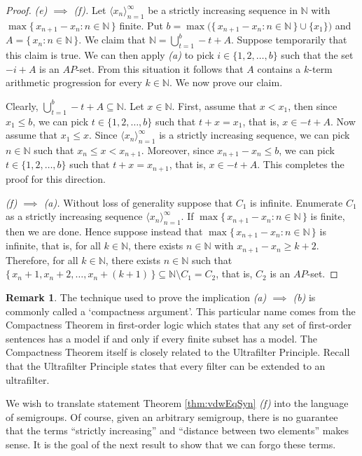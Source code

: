 \documentclass[12pt,showtrims]{memoir}
\theoremstyle{plain}
\theoremstyle{definition}
\newtheorem{rmk}[thm]{Remark}
\newcommand{\la}{\langle}
\newcommand{\ra}{\rangle}
\newcommand{\bbN}{\mathbb{N}}
\begin{document}
\begin{proof}
  \textsl{(e) $\implies$ (f).}
  Let $\la x_n \ra_{n=1}^\infty$ be a strictly increasing sequence in $\bbN$ with $\max\{\, x_{n+1} - x_n : n \in \bbN \,\}$ finite. 
  Put $b =\max\bigl(\{\, x_{n+1} - x_n : n \in \bbN \,\} \cup \{x_1\}\bigr)$ and $A = \{\, x_n : n \in \bbN \,\}$. 
  We claim that $\bbN = \bigcup_{t=1}^b -t+A$. 
  Suppose temporarily that this claim is true.
  We can then apply \textsl{(a)} to pick $i \in \{1, 2, \ldots, b\}$ such that the set $-i + A$ is an $AP$-set. 
  From this situation it follows that $A$ contains a $k$-term arithmetic progression for every $k \in \bbN$. 
  We now prove our claim.
  
  Clearly, $\bigcup_{t=1}^b -t+A \subseteq \bbN$.
  Let $x \in \bbN$.
  First, assume that $x < x_1$, then since $x_1 \le b$, we can pick $t \in \{1, 2, \ldots, b\}$ such that $t + x = x_1$, that is, $x \in -t+A$.
  Now assume that $x_1 \le x$.
  Since $\la x_n \ra_{n=1}^\infty$ is a strictly increasing sequence, we can pick $n \in \bbN$ such that $x_n \le x < x_{n+1}$.
  Moreover, since $x_{n+1} - x_n \le b$, we can pick $t \in \{1, 2, \ldots, b\}$ such that $t + x = x_{n+1}$, that is, $x \in -t + A$. 
  This completes the proof for this direction. 

  \textsl{(f) $\implies$ (a).}
  Without loss of generality suppose that $C_1$ is infinite.
  Enumerate $C_1$ as a strictly increasing sequence $\la x_n \ra_{n=1}^\infty$. 
  If $\max\{\, x_{n+1} - x_n : n \in \bbN \,\}$ is finite, then we are done. 
  Hence suppose instead that $\max\{\, x_{n+1} - x_n : n \in \bbN \,\}$ is infinite, that is, for all $k \in \bbN$, there exists $n \in \bbN$ with $x_{n+1} - x_n \ge k + 2$. 
  Therefore, for all $k \in \bbN$, there exists $n \in \bbN$ such that $\{\, x_n + 1, x_n + 2, \ldots, x_n + (k + 1) \,\} \subseteq \bbN \setminus C_1 = C_2$, that is, $C_2$ is an $AP$-set.
\end{proof}
\begin{rmk}
  The technique used to prove the implication \textsl{(a) $\implies$ (b)} is commonly called a `compactness argument'. 
  This particular name comes from the Compactness Theorem in first-order logic which states that any set of first-order sentences has a model if and only if every finite subset has a model. 
  The Compactness Theorem itself is closely related to the Ultrafilter Principle. 
  Recall that the Ultrafilter Principle states that every filter can be extended to an ultrafilter.
\end{rmk}

We wish to translate statement Theorem \ref{thm:vdwEqSyn} \textsl{(f)} into the language of semigroups.
Of course, given an arbitrary semigroup, there is no guarantee that the terms ``strictly increasing'' and ``distance between two elements'' makes sense.
It is the goal of the next result to show that we can forgo these terms.
\end{document}
